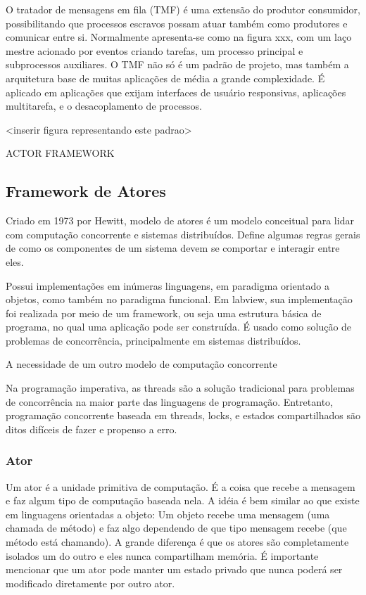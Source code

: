 
O tratador de mensagens em fila (TMF) é uma extensão do produtor consumidor, possibilitando que processos escravos possam atuar também como produtores e comunicar entre si. Normalmente apresenta-se como na figura xxx, com um laço mestre acionado por eventos criando tarefas, um processo principal e subprocessos auxiliares. O TMF não só é um padrão de projeto, mas também a arquitetura base de muitas aplicações de média a grande complexidade. É aplicado em aplicações que exijam interfaces de usuário responsivas, aplicações multitarefa, e o desacoplamento de processos.

<inserir figura representando este padrao>

ACTOR FRAMEWORK

        \subsection{Framework de Atores}
            \label{actorframework}

Criado em 1973 por Hewitt, modelo de atores é um modelo conceitual para lidar com computação concorrente e sistemas distribuídos. Define algumas regras gerais de como os componentes de um sistema devem se comportar e interagir entre eles. 

Possui implementações em inúmeras linguagens, em paradigma orientado a objetos, como também no paradigma funcional. Em labview, sua implementação foi realizada por meio de um framework, ou seja uma estrutura básica de programa, no qual uma aplicação pode ser construída. É usado como solução de problemas de concorrência, principalmente em sistemas distribuídos.

A necessidade de um outro modelo de computação concorrente

Na programação imperativa, as threads são a solução tradicional para problemas de concorrência  na maior parte das linguagens de programação. Entretanto, programação concorrente baseada em threads, locks, e estados compartilhados são ditos difíceis de fazer e propenso a erro.

\subsubsection{Ator}

Um ator é a unidade primitiva de computação. É a coisa que recebe a mensagem e faz algum tipo de computação baseada nela.
A idéia é bem similar ao que existe em linguagens orientadas a objeto: Um objeto recebe uma mensagem (uma chamada de método) e faz algo dependendo de que tipo mensagem recebe (que método está chamando).
A grande diferença é que os atores são completamente isolados um do outro e eles nunca compartilham memória. É importante mencionar que um ator pode manter um estado privado que nunca poderá ser modificado diretamente por outro ator.

